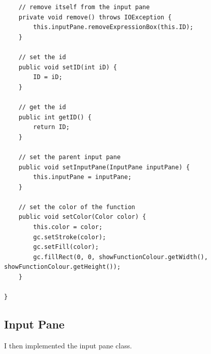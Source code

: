 \documentclass[../../../../main.tex]{subfiles}
\begin{document}
\begin{verbatim}
	// remove itself from the input pane
	private void remove() throws IOException {
		this.inputPane.removeExpressionBox(this.ID);
	}

	// set the id
	public void setID(int iD) {
		ID = iD;
	}

	// get the id
	public int getID() {
		return ID;
	}

	// set the parent input pane
	public void setInputPane(InputPane inputPane) {
		this.inputPane = inputPane;
	}

	// set the color of the function
	public void setColor(Color color) {
		this.color = color;
		gc.setStroke(color);
		gc.setFill(color);
		gc.fillRect(0, 0, showFunctionColour.getWidth(), showFunctionColour.getHeight());
	}

}
\end{verbatim}
\newpage
\subsection{Input Pane}
I then implemented the input pane class.
\newpage
\end{document}
